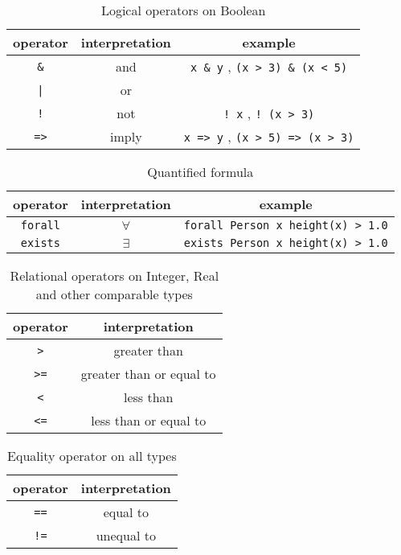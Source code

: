 \documentclass[12pt]{article}
\begin{document}
\begin{table}[h]
\centering
\caption{Logical operators on Boolean}
\begin{tabular}{ c c c }
\toprule 
operator & interpretation & example \\
\midrule
\verb|&| & and & \verb|x & y| , \verb|(x > 3) & (x < 5)| \\ 
{\tt |} & or & \verb\x | y\ , \verb\(x > 5) | (x < 3)\ \\ 
{\tt !} & not & \verb|! x| , \verb|! (x > 3)| \\
{\tt =>} & imply & \verb|x => y| , \verb|(x > 5) => (x > 3)| \\
\bottomrule
\end{tabular}
\end{table}

\begin{table}[h]
\centering
\caption{Quantified formula}
\begin{tabular}{ c c c }
\toprule 
operator & interpretation & example \\
\midrule
{\tt forall} & $\forall$ & \verb|forall Person x height(x) > 1.0| \\ 
{\tt exists} & $\exists$ & \verb|exists Person x height(x) > 1.0|  \\ 
\bottomrule
\end{tabular}
\end{table}

\begin{table}[h]
\centering
\caption{Relational operators on Integer, Real and other comparable types}
\begin{tabular}{ c c }
\toprule 
operator & interpretation \\
\midrule
{\tt >} & greater than \\ 
{\tt >=} & greater than or equal to \\ 
{\tt <} & less than \\
{\tt <=} & less than or equal to \\
\bottomrule
\end{tabular}
\end{table}

\begin{table}[h]
\centering
\caption{Equality operator on all types}
\begin{tabular}{ c c }
\toprule 
operator & interpretation \\
\midrule
{\tt ==} & equal to \\ 
{\tt !=} & unequal to \\ 
\bottomrule
\end{tabular}
\end{table}
\end{document}
